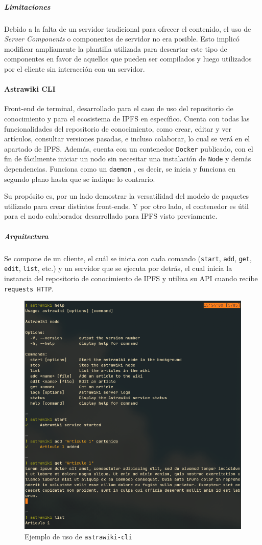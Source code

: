 \subparagraph{Limitaciones} Debido a la falta de un servidor tradicional para ofrecer el contenido, el uso de \textit{Server Components} o componentes de servidor \cite{server-components} no era posible. Esto implicó modificar ampliamente la plantilla utilizada para descartar este tipo de componentes en favor de aquellos que pueden ser compilados y luego utilizados por el cliente sin interacción con un servidor.

\paragraph{Astrawiki CLI}

Front-end de terminal, desarrollado para el caso de uso del repositorio de conocimiento y para el ecosistema de IPFS en específico. Cuenta con todas las funcionalidades del repositorio de conocimiento, como crear, editar y ver artículos, consultar versiones pasadas, e incluso colaborar, lo cual se verá en el apartado de IPFS. Además, cuenta con un contenedor \texttt{Docker} publicado, con el fin de fácilmente iniciar un nodo sin necesitar una instalación de \texttt{Node} y demás dependencias. Funciona como un \texttt{daemon} \cite{daemon}, es decir, se inicia y funciona en segundo plano hasta que se indique lo contrario.

Su propósito es, por un lado demostrar la versatilidad del modelo de paquetes utilizado para crear distintos front-ends. Y por otro lado, el contenedor es útil para el nodo colaborador desarrollado para IPFS visto previamente.

\subparagraph{Arquitectura} Se compone de un cliente, el cuál se inicia con cada comando (\texttt{start}, \texttt{add}, \texttt{get}, \texttt{edit}, \texttt{list}, etc.) y un servidor que se ejecuta por detrás, el cual inicia la instancia del repositorio de conocimiento de IPFS y utiliza su API cuando recibe \texttt{requests HTTP}.

\begin{figure}[H]
    \centering
    \includegraphics[width=0.7\linewidth]{img/astrawiki-cli.png}
    \caption{Ejemplo de uso de \texttt{astrawiki-cli}}
    \label{fig:astrawiki-cli}
\end{figure}

